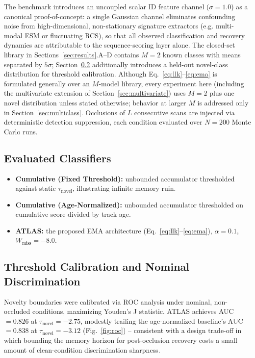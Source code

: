\documentclass[conference]{IEEEtran}
\begin{document}
The benchmark introduces an uncoupled scalar ID feature channel ($\sigma=1.0$) as a canonical proof-of-concept: a single Gaussian channel eliminates confounding noise from high-dimensional, non-stationary signature extractors (e.g. multi-modal ESM or fluctuating RCS), so that all observed classification and recovery dynamics are attributable to the sequence-scoring layer alone. The closed-set library in Sections~\ref{sec:results}.A--D contains $M=2$ known classes with means separated by $5\sigma$; Section~\ref{sec:roc} additionally introduces a held-out novel-class distribution for threshold calibration. Although Eq.~\eqref{eq:llk}--\eqref{eq:ema} is formulated generally over an $M$-model library, every experiment here (including the multivariate extension of Section~\ref{sec:multivariate}) uses $M=2$ plus one novel distribution unless stated otherwise; behavior at larger $M$ is addressed only in Section~\ref{sec:multiclass}. Occlusions of $L$ consecutive scans are injected via deterministic detection suppression, each condition evaluated over $N=200$ Monte Carlo runs.

\subsection{Evaluated Classifiers}
\begin{itemize}
    \item \textbf{Cumulative (Fixed Threshold):} unbounded accumulator thresholded against static $\tau_{\text{novel}}$, illustrating infinite memory ruin.
    \item \textbf{Cumulative (Age-Normalized):} unbounded accumulator thresholded on cumulative score divided by track age.
    \item \textbf{ATLAS:} the proposed EMA architecture (Eq.~\eqref{eq:llk}--\eqref{eq:ema}), $\alpha=0.1$, $W_{\text{miss}}=-8.0$.
\end{itemize}

\subsection{Threshold Calibration and Nominal Discrimination}
\label{sec:roc}
Novelty boundaries were calibrated via ROC analysis under nominal, non-occluded conditions, maximizing Youden's J statistic. ATLAS achieves AUC $=0.826$ at $\tau_{\text{novel}}=-2.75$, modestly trailing the age-normalized baseline's AUC $=0.838$ at $\tau_{\text{novel}}=-3.12$ (Fig.~\ref{fig:roc}) -- consistent with a design trade-off in which bounding the memory horizon for post-occlusion recovery costs a small amount of clean-condition discrimination sharpness.
\end{document}
